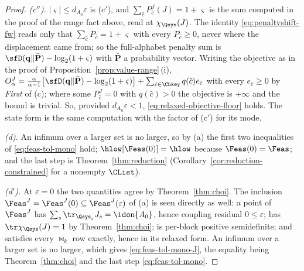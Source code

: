 \begin{proof}
\emph{(c$''$).} $|\varsigma|\le d_{A_0}\varepsilon$ is (c$'$), and
$\sum_{\hat c}P^{J}_{\hat c}(J)=1+\varsigma$ is the sum computed in the
proof of the range fact above, read at $\chi_{\Qsys}(J)$. The identity
\eqref{eq:penaltyshift-fw} reads only that
$\sum_{\hat c}P_{\hat c}=1+\varsigma$ with every $P_{\hat c}\ge0$, never
where the displacement came from; so the full-alphabet penalty sum is
$\sfD(\mathbf q\|\bar{\mathbf P})-\log_2(1+\varsigma)$ with
$\bar{\mathbf P}$ a probability vector. Writing the objective as in the
proof of Proposition~\ref{prop:value-range}\,(i),
$O^{J}_{\alpha}=\frac{\alpha}{\alpha-1}
\big[\sfD(\mathbf q\|\bar{\mathbf P})-\log_2(1+\varsigma)\big]
+\sum_{\hat c\in\Chkey}q(\hat c)e_{\hat c}$ with every $e_{\hat c}\ge0$ by
\emph{First} of (c); where some $P^{J}_{\hat c}=0$ with $q(\hat c)>0$ the
objective is $+\infty$ and the bound is trivial. So, provided
$d_{A_0}\varepsilon<1$, \eqref{eq:relaxed-objective-floor} holds. The
state form is the same computation with the factor of (c$'$) for its mode.

\emph{(d).} An infimum over a larger set is no larger, so by (a) the first
two inequalities of \eqref{eq:feas-tol-mono} hold;
$\hlow[\Feas(0)]=\hlow$ because $\Feas(0)=\Feas$; and the last step is
Theorem~\ref{thm:reduction} (Corollary~\ref{cor:reduction-constrained} for
a nonempty $\CList$).

\emph{(d$'$).} At $\varepsilon=0$ the two quantities agree by
Theorem~\ref{thm:choi}. The inclusion
$\Feas^{J}=\Feas^{J}(0)\subseteq\Feas^{J}(\varepsilon)$ of (a) is seen
directly as well: a point of $\Feas^{J}$ has
$\sum_s\tr_{\Qsys_s}J_s=\idon{A_0}$, hence coupling residual
$0\le\varepsilon$; has $\tr\chi_{\Qsys}(J)=1$ by
Theorem~\ref{thm:choi}; is per-block positive semidefinite; and satisfies
every $\bowtie_k$ row exactly, hence in its relaxed form. An infimum over a
larger set is no larger, which gives \eqref{eq:feas-tol-mono-J}, the
equality being Theorem~\ref{thm:choi} and the last step
\eqref{eq:feas-tol-mono}.


\end{proof}
